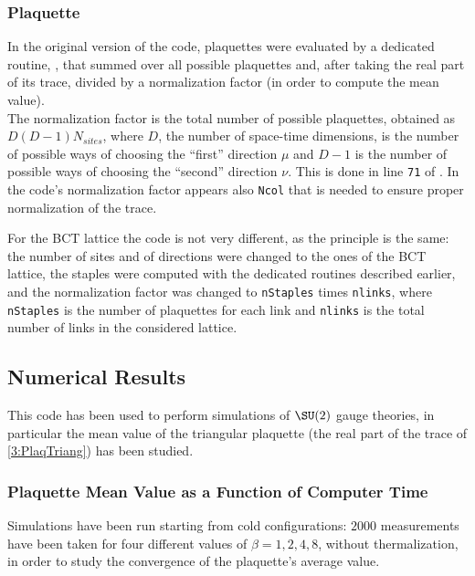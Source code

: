 \subsubsection{Plaquette}
In the original version of the code, plaquettes were evaluated by a dedicated routine, , that summed over all possible plaquettes and, after taking the real part of its trace, divided by a normalization factor (in order to compute the mean value).\\
The normalization factor is the total number of possible plaquettes, obtained as $D(D-1)N_{sites}$, where $D$, the number of space-time dimensions, is the number of possible ways of choosing the ``first'' direction $\mu$ and $D-1$ is the number of possible ways of choosing the ``second'' direction $\nu$.
This is done in line \texttt{71} of .
In the code's normalization factor appears also \texttt{Ncol} that is needed to ensure proper normalization of the trace.

For the BCT lattice the code is not very different, as the principle is the same: the number of sites and of directions were changed to the ones of the BCT lattice, the staples were computed with the dedicated routines described earlier, and the normalization factor was changed to \texttt{nStaples} times \texttt{nlinks}, where \texttt{nStaples} is the number of plaquettes for each link and \texttt{nlinks} is the total number of links in the considered lattice.

\subsection{Numerical Results}
This code has been used to perform simulations of $\SU(2)$ gauge theories, in particular the mean value of the triangular plaquette (the real part of the trace of \eqref{3:PlaqTriang}) has been studied.

\subsubsection{Plaquette Mean Value as a Function of Computer Time}
Simulations have been run starting from cold configurations: $2000$ measurements have been taken for four different values of $\beta=1,2,4,8$, without thermalization, in order to study the convergence of the plaquette's average value.


